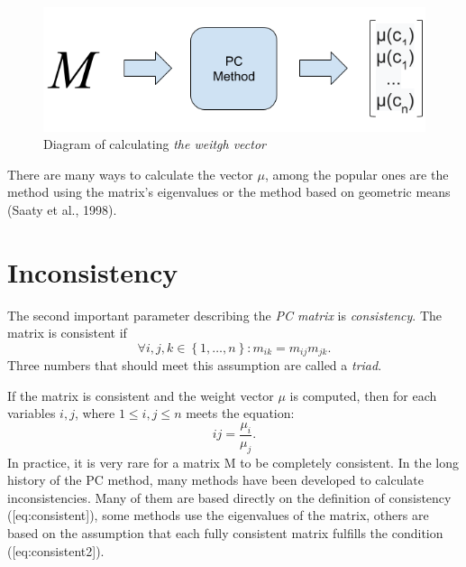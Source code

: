 \begin{figure}[h]
\centerline{\includegraphics[scale=2.5]{fig1.png}}
\caption{Diagram of calculating \textit{the weitgh vector}}
\label{fig:fig1}
\end{figure}

There are many ways to calculate the vector $\mu$, among the popular ones are the method using the matrix's eigenvalues or the method based on geometric means (Saaty et al., 1998).



\section{Inconsistency}
\label{subsec:inconsistency}
The second important parameter describing the \textit{PC matrix} is \textit{consistency}. The matrix is consistent if 
	\begin{equation} 
		\forall i,j,k \in\left\{ 1,\ldots,n\right\} :m_{ik}=m_{ij}m_{jk}.
	\end{equation}
Three numbers that should meet this assumption are called a \textit{triad}.

If the matrix is consistent and the weight vector $\mu$ is computed, then for each variables $i,j$, where $1\leq i,j\leq n$ meets the equation: 
	\begin{equation} 
		{ij}=\frac{\mu_{i}}{\mu_{j}}.
 	\end{equation}
In practice, it is very rare for a matrix M to be completely consistent. In the long history of the PC method, many methods have been developed to calculate inconsistencies. Many of them are based directly on the definition of consistency ([eq:consistent]), some methods use the eigenvalues of the matrix, others are based on the assumption that each fully consistent matrix fulfills the condition ([eq:consistent2]).
